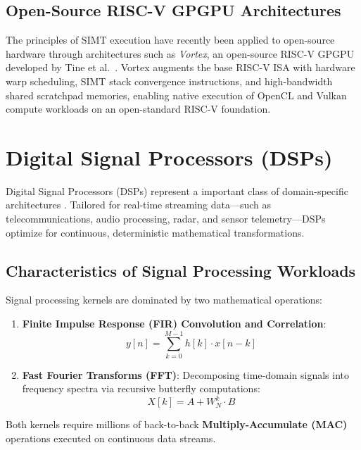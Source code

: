\subsection{Open-Source RISC-V GPGPU Architectures}
The principles of SIMT execution have recently been applied to open-source hardware through architectures such as \textit{Vortex}, an open-source RISC-V GPGPU developed by Tine et al.~\cite{tine2021vortex}. Vortex augments the base RISC-V ISA with hardware warp scheduling, SIMT stack convergence instructions, and high-bandwidth shared scratchpad memories, enabling native execution of OpenCL and Vulkan compute workloads on an open-standard RISC-V foundation.

\section{Digital Signal Processors (DSPs)}\label{sec:dsp_architecture}

Digital Signal Processors (DSPs) represent a important class of domain-specific architectures \cite{eyre2000evolution}. Tailored for real-time streaming data—such as telecommunications, audio processing, radar, and sensor telemetry—DSPs optimize for continuous, deterministic mathematical transformations.

\subsection{Characteristics of Signal Processing Workloads}
Signal processing kernels are dominated by two mathematical operations:
\begin{enumerate}
    \item \textbf{Finite Impulse Response (FIR) Convolution and Correlation}:
    \begin{equation}
    y[n] = \sum_{k=0}^{M-1} h[k] \cdot x[n-k]
    \end{equation}
    \item \textbf{Fast Fourier Transforms (FFT)}: Decomposing time-domain signals into frequency spectra via recursive butterfly computations:
    \begin{equation}
    X[k] = A + W_N^k \cdot B
    \end{equation}
\end{enumerate}
Both kernels require millions of back-to-back \textbf{Multiply-Accumulate (MAC)} operations executed on continuous data streams.

